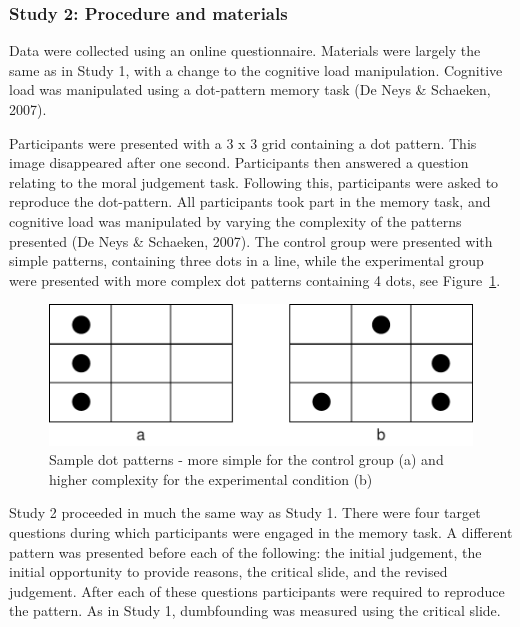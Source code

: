 \documentclass[
  american,
  man,floatsintext]{apa7}
\begin{document}
\hypertarget{study-2-procedure-and-materials}{%
\subsubsection{Study 2: Procedure and materials}\label{study-2-procedure-and-materials}}

Data were collected using an online questionnaire. Materials were largely the same as in Study 1, with a change to the cognitive load manipulation. Cognitive load was manipulated using a dot-pattern memory task (De Neys \& Schaeken, 2007).

Participants were presented with a 3 x 3 grid containing a dot pattern. This image disappeared after one second. Participants then answered a question relating to the moral judgement task. Following this, participants were asked to reproduce the dot-pattern. All participants took part in the memory task, and cognitive load was manipulated by varying the complexity of the patterns presented (De Neys \& Schaeken, 2007). The control group were presented with simple patterns, containing three dots in a line, while the experimental group were presented with more complex dot patterns containing 4 dots, see Figure~\ref{fig:S2dotpattern}.

\begin{figure}
\centering
\includegraphics{cog_load_in_chunks_files/figure-latex/S2dotpattern-1.pdf}
\caption{\label{fig:S2dotpattern}Sample dot patterns - more simple for the control group (a) and higher complexity for the experimental condition (b)}
\end{figure}

Study 2 proceeded in much the same way as Study 1. There were four target questions during which participants were engaged in the memory task. A different pattern was presented before each of the following: the initial judgement, the initial opportunity to provide reasons, the critical slide, and the revised judgement. After each of these questions participants were required to reproduce the pattern. As in Study 1, dumbfounding was measured using the critical slide.
\end{document}
